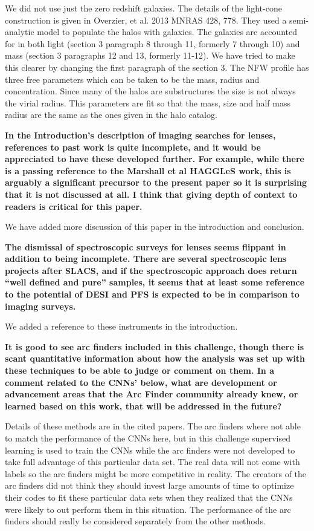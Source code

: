 \documentclass[11pt,a4paper]{article}
\begin{document}
We did not use just the zero redshift galaxies.  The details of the light-cone construction is given in Overzier, et al. 2013 MNRAS 428, 778.  They used a semi-analytic model to populate the halos with galaxies.  The galaxies are accounted for in both light (section 3 paragraph 8 through 11, formerly 7 through 10) and mass 
(section 3 paragraphs 12 and 13, formerly 11-12).  We have tried to make this clearer  by changing the first paragraph of the section 3.  The NFW profile has three free parameters which can be taken to be the mass, radius and concentration.  Since many of the halos are substructures the size is not always the virial radius.
This parameters are fit so that the mass, size and half mass radius are the same as the ones given in the halo catalog.

{\bf
In the Introduction’s description of imaging searches for lenses, references to past work is quite incomplete, and it would be appreciated to have these developed further.  For example, while there is a passing reference to the Marshall et al HAGGLeS work, this is arguably a significant precursor to the present paper so it is surprising that it is not discussed at all.  I think that giving depth of context to readers is critical for this paper. 
}

We have added more discussion of this paper in the introduction and conclusion.

{\bf
The dismissal of spectroscopic surveys for lenses seems flippant in addition to being incomplete. There are several spectroscopic lens projects after SLACS, and if the spectroscopic approach does return “well defined and pure” samples, it seems that at least some reference to the potential of DESI and PFS is expected to be in comparison to imaging surveys. 
}

We added a reference to these instruments in the introduction.

{\bf
It is good to see arc finders included in this challenge, though there is scant quantitative information about how the analysis was set up with these techniques to be able to judge or comment on them. In a comment related to the CNNs’ below, what are development or advancement areas that the Arc Finder community already knew, or learned based on this work, that will be addressed in the future?  
}

Details of these methods are in the cited papers.  The arc finders where not able to match the performance 
of the CNNs here, but in this challenge supervised learning is used to train the CNNs while the arc finders were not developed to take full advantage of this particular data set.  The real data will not come with labels so the arc finders might be more competitive in reality.  The creators of the arc finders did not think they should invest large amounts of time to optimize their codes to fit these particular data sets when they 
realized that the CNNs were likely to out perform them in this situation.  The performance of the arc finders  should really be considered separately from the other methods. 
\end{document}
